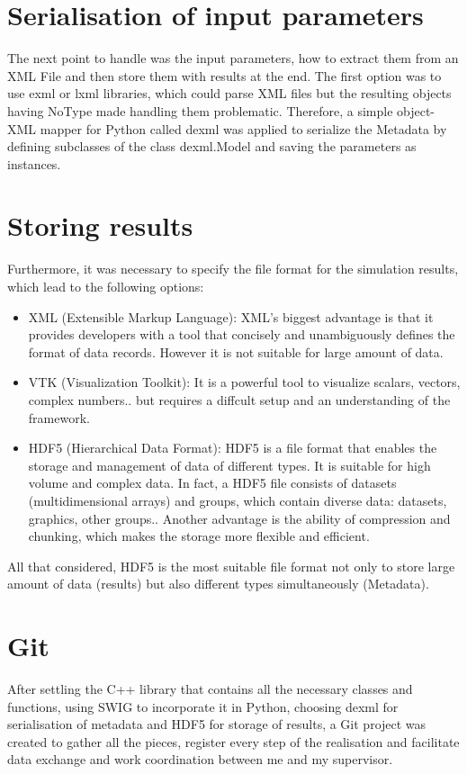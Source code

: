 \section{Serialisation of input parameters}
The next point to handle was the input parameters, how to extract them from an XML File and then store them with results at the end. The first option was to use exml or lxml libraries, which could parse XML files but the resulting objects having NoType made handling them problematic. Therefore, a simple object-XML mapper for Python called dexml was applied to serialize the Metadata by defining subclasses of the class dexml.Model and saving the parameters as instances.\\
\section{Storing results}
Furthermore, it was necessary to specify the file format for the simulation results, which lead to the following options:\\
\begin{itemize}
\item XML (Extensible Markup Language): XML's biggest advantage is that it provides developers with a tool that concisely and unambiguously defines the format of data records. However it is not suitable for large amount of data.\\
\item VTK (Visualization Toolkit): It is a powerful tool to visualize scalars, vectors, complex numbers.. but  requires a diffcult setup and an understanding of the framework.\\ 
\item HDF5 (Hierarchical Data Format): HDF5 is a file format that enables the storage and management of data of different types. It is suitable for high volume and complex data. In fact, a HDF5 file consists of datasets (multidimensional arrays) and groups, which contain diverse data: datasets, graphics, other groups.. Another advantage is the ability of compression and chunking, which makes the storage more flexible and efficient.\\ 
\end{itemize}
All that considered, HDF5 is the most suitable file format not only to store large amount of data (results) but also different types simultaneously (Metadata).
\section{Git}
After settling the C++ library that contains all the necessary classes and functions, using SWIG to incorporate it in Python, choosing dexml for serialisation of metadata and HDF5 for storage of results, a Git project was created to gather all the pieces, register every step of the realisation and facilitate data exchange and work coordination between me and my supervisor. \\
